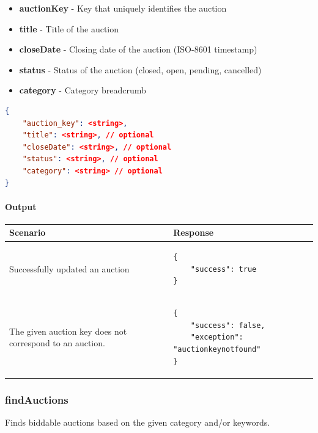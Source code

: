 \documentclass[12pt,a4paper]{article}
\begin{document}
\begin{itemize}
    \item \textbf{auctionKey} - Key that uniquely identifies the auction
    \item \textbf{title} - Title of the auction 
    \item \textbf{closeDate} - Closing date of the auction (ISO-8601 timestamp)
    \item \textbf{status} - Status of the auction (closed, open, pending, cancelled)
    \item \textbf{category} - Category breadcrumb
\end{itemize}
\begin{lstlisting}[language=json,numbers=none]
{
    "auction_key": <string>,
    "title": <string>, // optional
    "closeDate": <string>, // optional
    "status": <string>, // optional
    "category": <string> // optional
}
\end{lstlisting}

\paragraph{Output}
\begin{center}
    \begin{tabular}{| p{7cm} | l |}
        \hline
        \textbf{Scenario} & \textbf{Response} \\
        \hline
        Successfully updated an auction &
        \begin{lstlisting}[language=tablejson,firstnumber=1]
{
    "success": true
}
        \end{lstlisting} \\ 
        \hline
        The given auction key does not correspond to an auction. & 
        \begin{lstlisting}[language=tablejson,firstnumber=1]
{
    "success": false,
    "exception": "auctionkeynotfound"
}
        \end{lstlisting} \\
        \hline
    \end{tabular}
\end{center}

\pagebreak
\subsubsection{findAuctions}
Finds biddable auctions based on the given category and/or keywords. 
\end{document}
